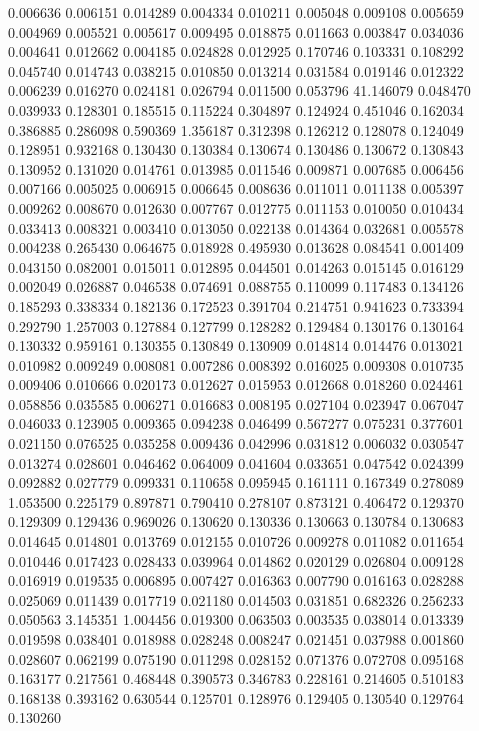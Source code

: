 0.006636
0.006151
0.014289
0.004334
0.010211
0.005048
0.009108
0.005659
0.004969
0.005521
0.005617
0.009495
0.018875
0.011663
0.003847
0.034036
0.004641
0.012662
0.004185
0.024828
0.012925
0.170746
0.103331
0.108292
0.045740
0.014743
0.038215
0.010850
0.013214
0.031584
0.019146
0.012322
0.006239
0.016270
0.024181
0.026794
0.011500
0.053796
41.146079
0.048470
0.039933
0.128301
0.185515
0.115224
0.304897
0.124924
0.451046
0.162034
0.386885
0.286098
0.590369
1.356187
0.312398
0.126212
0.128078
0.124049
0.128951
0.932168
0.130430
0.130384
0.130674
0.130486
0.130672
0.130843
0.130952
0.131020
0.014761
0.013985
0.011546
0.009871
0.007685
0.006456
0.007166
0.005025
0.006915
0.006645
0.008636
0.011011
0.011138
0.005397
0.009262
0.008670
0.012630
0.007767
0.012775
0.011153
0.010050
0.010434
0.033413
0.008321
0.003410
0.013050
0.022138
0.014364
0.032681
0.005578
0.004238
0.265430
0.064675
0.018928
0.495930
0.013628
0.084541
0.001409
0.043150
0.082001
0.015011
0.012895
0.044501
0.014263
0.015145
0.016129
0.002049
0.026887
0.046538
0.074691
0.088755
0.110099
0.117483
0.134126
0.185293
0.338334
0.182136
0.172523
0.391704
0.214751
0.941623
0.733394
0.292790
1.257003
0.127884
0.127799
0.128282
0.129484
0.130176
0.130164
0.130332
0.959161
0.130355
0.130849
0.130909
0.014814
0.014476
0.013021
0.010982
0.009249
0.008081
0.007286
0.008392
0.016025
0.009308
0.010735
0.009406
0.010666
0.020173
0.012627
0.015953
0.012668
0.018260
0.024461
0.058856
0.035585
0.006271
0.016683
0.008195
0.027104
0.023947
0.067047
0.046033
0.123905
0.009365
0.094238
0.046499
0.567277
0.075231
0.377601
0.021150
0.076525
0.035258
0.009436
0.042996
0.031812
0.006032
0.030547
0.013274
0.028601
0.046462
0.064009
0.041604
0.033651
0.047542
0.024399
0.092882
0.027779
0.099331
0.110658
0.095945
0.161111
0.167349
0.278089
1.053500
0.225179
0.897871
0.790410
0.278107
0.873121
0.406472
0.129370
0.129309
0.129436
0.969026
0.130620
0.130336
0.130663
0.130784
0.130683
0.014645
0.014801
0.013769
0.012155
0.010726
0.009278
0.011082
0.011654
0.010446
0.017423
0.028433
0.039964
0.014862
0.020129
0.026804
0.009128
0.016919
0.019535
0.006895
0.007427
0.016363
0.007790
0.016163
0.028288
0.025069
0.011439
0.017719
0.021180
0.014503
0.031851
0.682326
0.256233
0.050563
3.145351
1.004456
0.019300
0.063503
0.003535
0.038014
0.013339
0.019598
0.038401
0.018988
0.028248
0.008247
0.021451
0.037988
0.001860
0.028607
0.062199
0.075190
0.011298
0.028152
0.071376
0.072708
0.095168
0.163177
0.217561
0.468448
0.390573
0.346783
0.228161
0.214605
0.510183
0.168138
0.393162
0.630544
0.125701
0.128976
0.129405
0.130540
0.129764
0.130260
